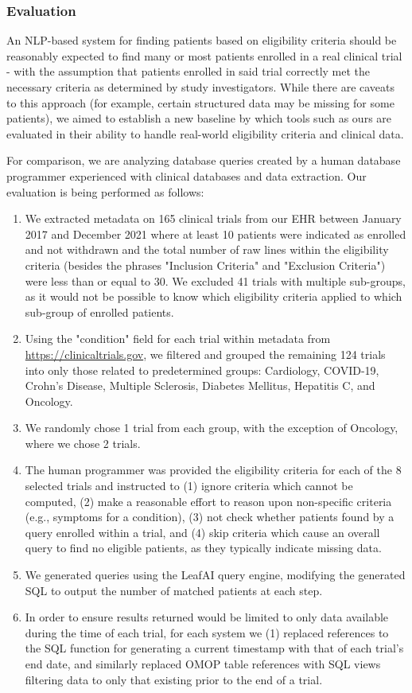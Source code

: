 \documentclass[../main.tex]{subfiles}
\begin{document}
\subsubsection{Evaluation}
An NLP-based system for finding patients based on eligibility criteria should be reasonably expected to find many or most patients enrolled in a real clinical trial - with the assumption that patients enrolled in said trial correctly met the necessary criteria as determined by study investigators. While there are caveats to this approach (for example, certain structured data may be missing for some patients), we aimed to establish a new baseline by which tools such as ours are evaluated in their ability to handle real-world eligibility criteria and clinical data.

For comparison, we are analyzing database queries created by a human database programmer experienced with clinical databases and data extraction. Our evaluation is being performed as follows:

\begin{enumerate}
    \item We extracted metadata on 165 clinical trials from our EHR between January 2017 and December 2021 where at least 10 patients were indicated as enrolled and not withdrawn and the total number of raw lines within the eligibility criteria (besides the phrases "Inclusion Criteria" and "Exclusion Criteria") were less than or equal to 30. We excluded 41 trials with multiple sub-groups, as it would not be possible to know which eligibility criteria applied to which sub-group of enrolled patients.
    \item Using the "condition" field for each trial within metadata from \url{https://clinicaltrials.gov}, we filtered and grouped the remaining 124 trials into only those related to predetermined groups: Cardiology, COVID-19, Crohn's Disease, Multiple Sclerosis, Diabetes Mellitus, Hepatitis C, and Oncology. 
    \item We randomly chose 1 trial from each group, with the exception of Oncology, where we chose 2 trials.
    \item The human programmer was provided the eligibility criteria for each of the 8 selected trials and instructed to (1) ignore criteria which cannot be computed, (2) make a reasonable effort to reason upon non-specific criteria (e.g., symptoms for a condition), (3) not check whether patients found by a query enrolled within a trial, and (4) skip criteria which cause an overall query to find no eligible patients, as they typically indicate missing data.
    \item We generated queries using the LeafAI query engine, modifying the generated SQL to output the number of matched patients at each step. 
    \item In order to ensure results returned would be limited to only data available during the time of each trial, for each system we (1) replaced references to the SQL function for generating a current timestamp with that of each trial's end date, and similarly replaced OMOP table references with SQL views filtering data to only that existing prior to the end of a trial.
\end{enumerate}
\end{document}

